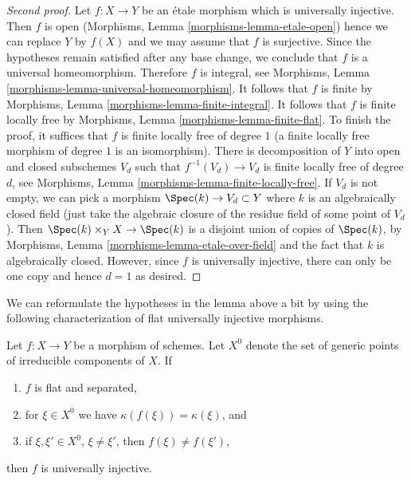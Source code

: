 \begin{proof}[Second proof]
Let $f : X \to Y$ be an \'etale morphism which is universally injective.
Then $f$ is open (Morphisms, Lemma \ref{morphisms-lemma-etale-open})
hence we can replace $Y$ by $f(X)$ and we may assume that $f$ is surjective.
Since the hypotheses remain satisfied after any base change, we conclude
that $f$ is a universal homeomorphism. Therefore $f$ is integral, see
Morphisms, Lemma \ref{morphisms-lemma-universal-homeomorphism}.
It follows that $f$ is finite by
Morphisms, Lemma \ref{morphisms-lemma-finite-integral}.
It follows that $f$ is finite locally free by
Morphisms, Lemma \ref{morphisms-lemma-finite-flat}.
To finish the proof, it suffices that $f$ is finite locally
free of degree $1$ (a finite locally free morphism of degree $1$
is an isomorphism).
There is decomposition of $Y$ into open and closed subschemes
$V_d$ such that $f^{-1}(V_d) \to V_d$ is finite locally free of
degree $d$, see Morphisms, Lemma \ref{morphisms-lemma-finite-locally-free}.
If $V_d$ is not empty, we can pick a morphism $\Spec(k) \to V_d \subset Y$
where $k$ is an algebraically closed field (just take the algebraic
closure of the residue field of some point of $V_d$).
Then $\Spec(k) \times_Y X \to \Spec(k)$ is a disjoint union of
copies of $\Spec(k)$, by
Morphisms, Lemma \ref{morphisms-lemma-etale-over-field}
and the fact that $k$ is algebraically closed.
However, since $f$ is universally injective, there can only be
one copy and hence $d = 1$ as desired.
\end{proof}

\noindent
We can reformulate the hypotheses in the lemma above a bit by using the
following characterization of flat universally injective morphisms.

\begin{lemma}
\label{lemma-flat-universally-injective}
Let $f : X \to Y$ be a morphism of schemes. Let $X^0$ denote the set
of generic points of irreducible components of $X$. If
\begin{enumerate}
\item $f$ is flat and separated,
\item for $\xi \in X^0$ we have $\kappa(f(\xi)) = \kappa(\xi)$, and
\item if $\xi, \xi' \in X^0$, $\xi \not = \xi'$, then $f(\xi) \not = f(\xi')$,
\end{enumerate}
then $f$ is universally injective.
\end{lemma}

